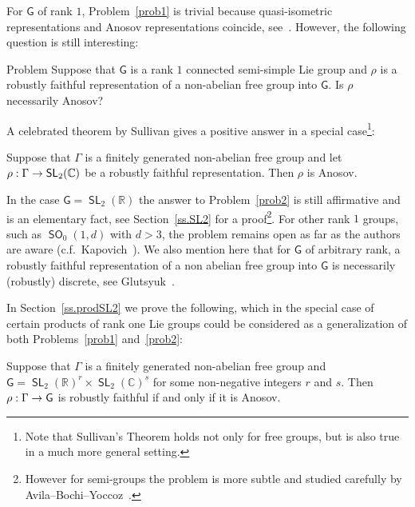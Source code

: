 \documentclass[AHL,Unicode,longabstracts]{cedram}
\DeclareMathOperator{\SL}{\mathsf{SL}}
\DeclareMathOperator{\SO}{\mathsf{SO}}
\newcommand{\R}{\mathbb{R}}
\newcommand{\C}{\mathbb{C}}
\newcommand{\sG}{\mathsf{G}}
\renewcommand*{\to}{\mathchoice{\longrightarrow}{\rightarrow}{\rightarrow}{\rightarrow}}
\begin{document}
For $\sG$ of rank $1$, Problem~\ref{prob1} is trivial because quasi-isometric representations and Anosov representations coincide, see~\cite[Theorem~5.15]{GW}. However, the following question is still interesting:

\begin{enonce}{Problem}\label{prob2}
Suppose that $\sG$ is a rank $1$ connected semi-simple Lie group and $\rho$ is a robustly faithful representation of a non-abelian free group into $\sG$. Is $\rho$ necessarily Anosov?
\end{enonce}

A celebrated theorem by Sullivan gives a positive answer in a special case\footnote{Note that Sullivan's Theorem holds not only for free groups, but is also true in a much more general setting.}:

\begin{theo}\label{teo: sullivan}
Suppose that $\Gamma$ is a finitely generated non-abelian free group and let $\rho:\Gamma\to \SL_2(\C)$ be a robustly faithful representation. Then $\rho$ is Anosov.
\end{theo}



In the case $\sG =\SL_2(\R)$ the answer to Problem~\ref{prob2} is still affirmative and is an elementary fact, see Section~\ref{ss.SL2} for a proof\footnote{However for semi-groups the problem is more subtle and studied carefully by Avila--Bochi--Yoccoz~\cite{avila-bochi-yoccoz}.}.
For other rank $1$ groups, such as $\SO_0(1,d)$ with $d>3$, the problem remains open as far as the authors are aware (c.f.~Kapovich~\cite[Question 11.14]{kapkleiniansurvey}). We also mention here that for $\sG$ of arbitrary rank, a robustly faithful representation of a non abelian free group into $\sG$ is necessarily (robustly) discrete, see Glutsyuk~\cite[Theorem~1.2]{glutsyuk}.

In Section~\ref{ss.prodSL2} we prove the following, which in the special case of certain products of rank one Lie groups could be considered as a generalization of both Problems~\ref{prob1} and~\ref{prob2}:

\begin{theo}\label{theoproduct}
Suppose that $\Gamma$ is a finitely generated non-abelian free group and $\sG = \SL_2(\R)^r \times \SL_2(\C)^s$ for some non-negative integers $r$ and $s$. Then $\rho:\Gamma \to \sG$ is robustly faithful if and only if it is Anosov.
\end{theo}
\end{document}
